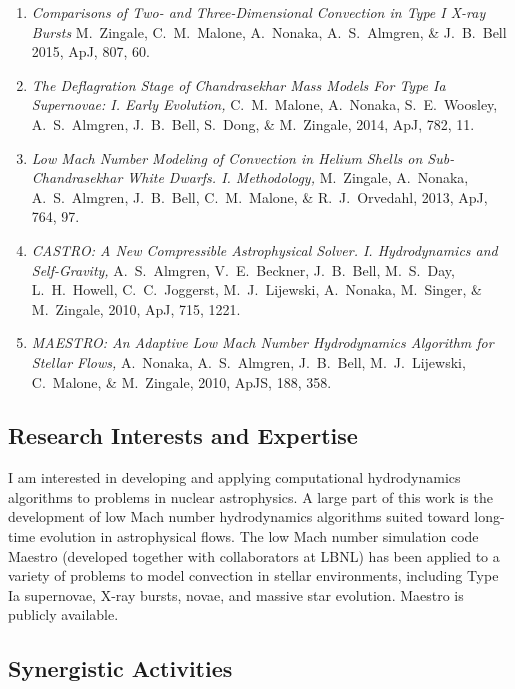 \documentclass[11pt,letterpaper,english]{article}
\begin{document}
\begin{enumerate} \itemsep1pt \parskip0pt 
\item {\it Comparisons of Two- and Three-Dimensional Convection in
  Type I X-ray Bursts}
  M.~Zingale, C.~M.~Malone, A.~Nonaka, A.~S.~Almgren, \& J.~B.~Bell
  2015, ApJ, 807, 60.

\item {\it The Deflagration Stage of Chandrasekhar Mass Models For
  Type Ia Supernovae: I. Early Evolution, } C.~M.~Malone, A.~Nonaka,
  S.~E.~Woosley, A.~S.~Almgren, J.~B.~Bell, S.~Dong, \& M.~Zingale,
  2014, ApJ, 782, 11.

\item {\it Low Mach Number Modeling of Convection in Helium Shells on
  Sub-Chandrasekhar White Dwarfs. I. Methodology,} M.~Zingale,
  A.~Nonaka, A.~S.~Almgren, J.~B.~Bell, C.~M.~Malone, \&
  R.~J.~Orvedahl, 2013, ApJ, 764, 97.

\item {\it CASTRO: A New Compressible Astrophysical
  Solver. I. Hydrodynamics and Self-Gravity,} A.~S.~Almgren,
  V.~E.~Beckner, J.~B.~Bell, M.~S.~Day, L.~H.~Howell, C.~C.~Joggerst,
  M.~J.~Lijewski, A.~Nonaka, M.~Singer, \& M.~Zingale, 2010, ApJ, 715,
  1221.

\item {\it MAESTRO: An Adaptive Low Mach Number Hydrodynamics
  Algorithm for Stellar Flows,} A.~Nonaka, A.~S.~Almgren, J.~B.~Bell,
  M.~J.~Lijewski, C.~Malone, \& M.~Zingale, 2010, ApJS, 188, 358.

\end{enumerate}


\subsection*{Research Interests and Expertise}

I am interested in developing and applying computational hydrodynamics
algorithms to problems in nuclear astrophysics.  A large part of this
work is the development of low Mach number hydrodynamics algorithms
suited toward long-time evolution in astrophysical flows.  The low
Mach number simulation code Maestro (developed together with
collaborators at LBNL) has been applied to a variety of problems to
model convection in stellar environments, including Type Ia
supernovae, X-ray bursts, novae, and massive star evolution.  Maestro
is publicly available.



\subsection*{Synergistic Activities}
\end{document}
